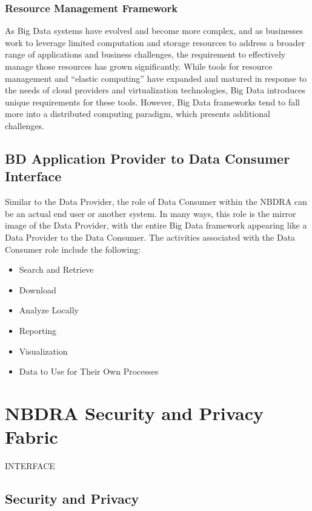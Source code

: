 \documentclass[11pt]{article}
\newcommand{\TODO}[1]{\todo{#1}}
\begin{document}
\subsubsection{Resource Management Framework}

As Big Data systems have evolved and become more complex, and as businesses work to leverage limited 
computation and storage resources to address a broader range of applications and business challenges, the 
requirement to effectively manage those resources has grown significantly. While tools for resource 
management and “elastic computing” have expanded and matured in response to the needs of cloud 
providers and virtualization technologies, Big Data introduces unique requirements for these tools. 
However, Big Data frameworks tend to fall more into a distributed computing paradigm, which presents 
additional challenges. 

\subsection{BD Application Provider to Data Consumer Interface}

Similar to the Data Provider, the role of Data Consumer within the NBDRA can be an actual end user or 
another system. In many ways, this role is the mirror image of the Data Provider, with the entire Big Data 
framework appearing like a Data Provider to the Data Consumer. The activities associated with the Data 
Consumer role include the following:

\begin{itemize}
\item	Search and Retrieve
\item	Download
\item	Analyze Locally
\item	Reporting
\item	Visualization
\item	Data to Use for Their Own Processes
\end{itemize}


\section{NBDRA Security and Privacy Fabric}

INTERFACE

\TODO{Security and privacy}

\subsection{Security and Privacy}
\end{document}
